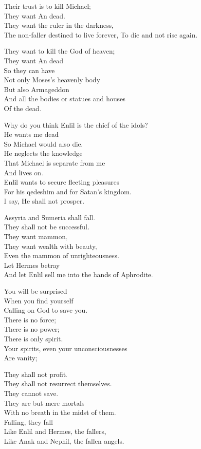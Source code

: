 \documentclass[
]{book}
\begin{document}
Their trust is to kill Michael;\\
They want An dead.\\
They want the ruler in the darkness,\\
The non-faller destined to live forever,
To die and not rise again.

They want to kill the God of heaven;\\
They want An dead\\
So they can have\\
Not only Moses's heavenly body\\
But also Armageddon\\
And all the bodies or statues and houses\\
Of the dead.

Why do you think Enlil is the chief of the idols?\\
He wants me dead\\
So Michael would also die.\\
He neglects the knowledge\\
That Michael is separate from me\\
And lives on.\\
Enlil wants to secure fleeting pleasures\\
For his qedeshim and for Satan's kingdom.\\
I say, He shall not prosper.

Assyria and Sumeria shall fall.\\
They shall not be successful.\\
They want mammon,\\
They want wealth with beauty,\\
Even the mammon of unrighteousness.\\
Let Hermes betray\\
And let Enlil sell me into the hands of Aphrodite.

You will be surprised\\
When you find yourself\\
Calling on God to save you.\\
There is no force;\\
There is no power;\\
There is only spirit.\\
Your spirits, even your unconsciousnesses\\
Are vanity;

They shall not profit.\\
They shall not resurrect themselves.\\
They cannot save.\\
They are but mere mortals\\
With no breath in the midst of them.\\
Falling, they fall\\
Like Enlil and Hermes, the fallers,\\
Like Anak and Nephil, the fallen angels.
\end{document}
